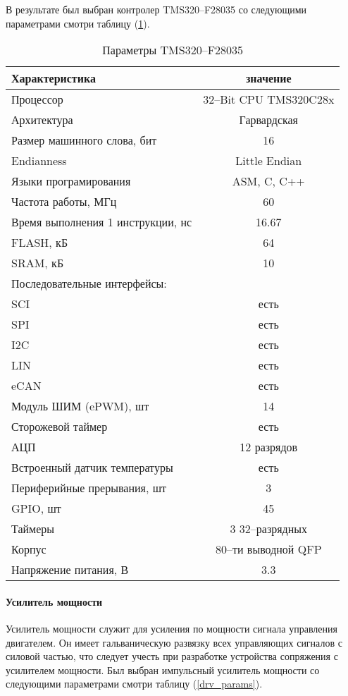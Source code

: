 В результате был выбран контролер TMS320--F28035 со следующими параметрами
смотри таблицу (\ref{mcu_params}).
\begin{table}[ht!]
    \centering
    \begin{tabular}{|l|c|}
        \hline
        Характеристика & значение \\
        \hline \hline
        Процессор & 32--Bit CPU TMS320C28x \\
        Архитектура & Гарвардская \\
        Размер машинного слова, бит & 16 \\
        Endianness & Little Endian \\
        Языки програмирования & ASM, C, C++ \\
        Частота работы, МГц & 60 \\
        Время выполнения 1 инструкции, нс & 16.67 \\
        \hline
        FLASH, кБ & 64 \\
        SRAM,  кБ & 10 \\
        \hline
        Последовательные интерфейсы: & \\
        SCI  & есть \\
        SPI  & есть \\
        I2C  & есть \\
        LIN  & есть \\
        eCAN & есть \\
        \hline
        Модуль ШИМ (ePWM), шт & 14 \\
        \hline
        Сторожевой таймер & есть \\
        \hline
        АЦП & 12 разрядов \\
        \hline
        Встроенный датчик температуры & есть \\
        \hline
        Периферийные прерывания, шт & 3 \\
        \hline
        GPIO, шт  & 45 \\
        \hline
        Таймеры & 3 32--разрядных \\
        \hline
        Корпус & 80--ти выводной QFP \\
        \hline
        Напряжение питания, В & 3.3 \\
        \hline
    \end{tabular}
    \caption{Параметры TMS320--F28035}
    \label{mcu_params}
\end{table}


\paragraph{Усилитель мощности}
Усилитель мощности служит для усиления по мощности сигнала управления
двигателем. Он имеет гальваническую развязку всех управляющих сигналов с силовой
частью, что следует учесть при разработке устройства сопряжения с усилителем
мощности.
Был выбран импульсный усилитель мощности со следующими параметрами
смотри таблицу (\ref{drv_params}).

